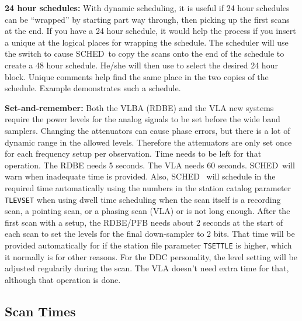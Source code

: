 \documentclass{report}
\newcommand{\schedb}{{\sc SCHED~}}
\begin{document}
\begin{list}{}{\parsep .5em  \itemsep .5em }
\item{\bf 24 hour schedules:} With dynamic scheduling, it is useful if
24 hour schedules can be ``wrapped'' by starting part way through,
then picking up the first scans at the end.  If you have a 24 hour
schedule, it would help the process if you insert a unique
 at the logical places for wrapping
the schedule.  The scheduler will use the  switch to cause \schedb to copy the scans onto the
end of the schedule to create a 48 hour schedule.  He/she will then
use  to select the desired 24 hour
block.  Unique comments help find the same place in the two copies of
the schedule.  Example  demonstrates such a schedule.

\item{\bf Set-and-remember:} Both the VLBA (RDBE) and the VLA new
systems require the power levels for the analog signals to be set
before the wide band samplers.  Changing the attenuators can cause
phase errors, but there is a lot of dynamic range in the allowed
levels.  Therefore the attenuators are only set once for each
frequency setup per observation.  Time needs to be left for that
operation.  The RDBE needs 5 seconds.  The VLA needs 60 seconds.
\schedb will warn when inadequate time is provided.  Also, \schedb
will schedule in the required time automatically using the numbers in
the station catalog parameter {\tt TLEVSET} when using dwell time
scheduling when the scan itself is a recording scan, a pointing scan,
or a phasing scan (VLA) or is not long enough.  After the first scan
with a setup, the RDBE/PFB needs about 2 seconds at the start of each
scan to set the levels for the final down-sampler to 2 bits.  That
time will be provided automatically for if the station file parameter
{\tt TSETTLE} is higher, which it normally is for other reasons.  For
the DDC personality, the level setting will be adjusted regularily
during the scan.  The VLA doesn't need extra time for that, although
that operation is done.


\end{list}



\subsection{\label{SSEC:SCANTIMES}Scan Times}
\end{document}
